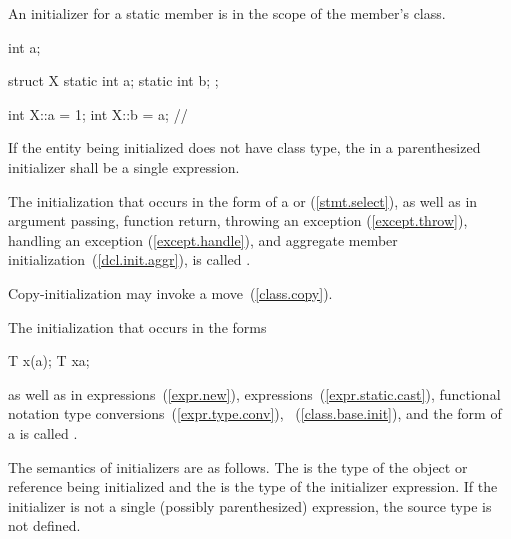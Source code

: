\pnum
{}%
An initializer for a static member is in the scope of the member's class.
\begin{example}

\begin{codeblock}
int a;

struct X {
  static int a;
  static int b;
};

int X::a = 1;
int X::b = a;       // 
\end{codeblock}
\end{example}

\pnum
If the entity being initialized does not have class type, the
 in a
parenthesized initializer shall be a single expression.

\pnum
{}%
%
The initialization that occurs in the \tcode{=} form of a
 or
 (\ref{stmt.select}),
as well as in argument passing, function return,
throwing an exception (\ref{except.throw}),
handling an exception (\ref{except.handle}),
and aggregate member initialization~(\ref{dcl.init.aggr}),
is called
.
\begin{note} Copy-initialization may invoke a move~(\ref{class.copy}). \end{note}

\pnum
The initialization that occurs in the forms

\begin{codeblock}
T x(a);
T x{a};
\end{codeblock}

as well as in
expressions~(\ref{expr.new}),
expressions~(\ref{expr.static.cast}),
functional notation type conversions~(\ref{expr.type.conv}),
~(\ref{class.base.init}), and
the  form of a 
is called
.

\pnum
The semantics of initializers are as follows.
The
%
is the type of the object or reference being initialized and the
is the type of the initializer expression.
If the initializer is not a single (possibly parenthesized) expression, the
source type is not defined.

